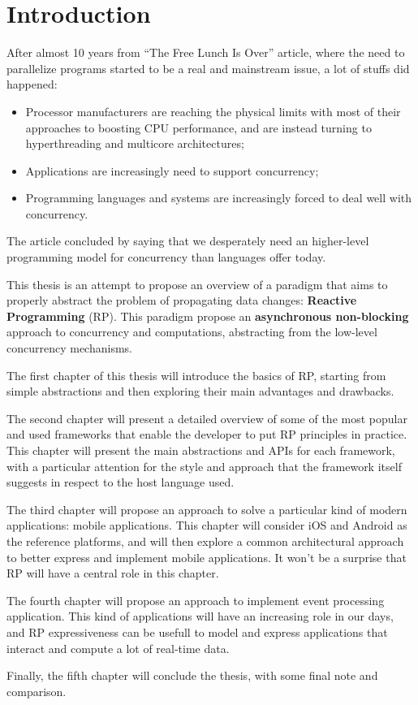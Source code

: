 \chapter{Introduction}
\label{ch:intro}

After almost 10 years from ``The Free Lunch Is Over'' article, where the
need to parallelize programs started to be a real and mainstream issue,
a lot of stuffs did happened:

\begin{itemize}
\item
  Processor manufacturers are reaching the physical limits with most of
  their approaches to boosting CPU performance, and are instead turning
  to hyperthreading and multicore architectures;
\item
  Applications are increasingly need to support concurrency;
\item
  Programming languages and systems are increasingly forced to deal well
  with concurrency.
\end{itemize}

The article concluded by saying that we desperately need an higher-level
programming model for concurrency than languages offer today.

This thesis is an attempt to propose an overview of a paradigm that aims
to properly abstract the problem of propagating data changes:
\textbf{Reactive Programming} (RP). This paradigm propose an
\textbf{asynchronous non-blocking} approach to concurrency and
computations, abstracting from the low-level concurrency mechanisms.


The first chapter of this thesis will introduce the basics of RP, starting from simple abstractions and then exploring their main advantages and drawbacks.

The second chapter will present a detailed overview of some of the most popular and used frameworks that enable the developer to put RP principles in practice. This chapter will present the main abstractions and APIs for each framework, with a particular attention for the style and approach that the framework itself suggests in respect to the host language used.

The third chapter will propose an approach to solve a particular kind of modern applications: mobile applications. This chapter will consider iOS and Android as the reference platforms, and will then explore a common architectural approach to better express and implement mobile applications. It won't be a surprise that RP will have a central role in this chapter.

The fourth chapter will propose an approach to implement event processing application. This kind of applications will have an increasing role in our days, and RP expressiveness can be usefull to model and express applications that interact and compute a lot of real-time data.

Finally, the fifth chapter will conclude the thesis, with some final note and comparison.